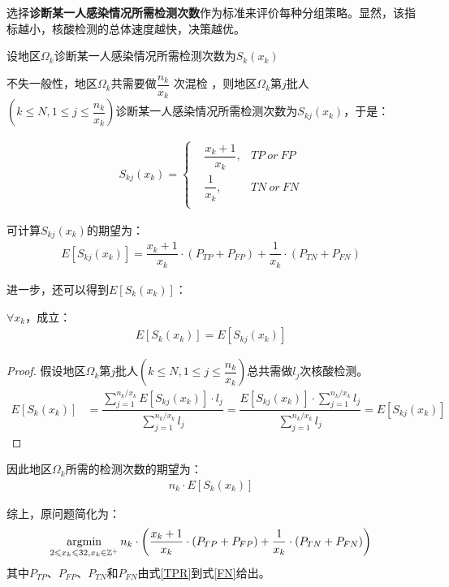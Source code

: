 \documentclass[withoutpreface,bwprint]{cumcmthesis} %
\begin{document}
选择\textbf{诊断某一人感染情况所需检测次数}作为标准来评价每种分组策略。显然，该指标越小，核酸检测的总体速度越快，决策越优。

设地区$\Omega_k$诊断某一人感染情况所需检测次数为$S_{k}(x_k)$

不失一般性，地区$\Omega_k$共需要做$ \dfrac{n_k}{x_k}$ 次混检 ，则地区$\Omega_k$第$j$批人$(k\leqslant N,1 \leqslant j \leqslant \dfrac{n_k}{x_k})$诊断某一人感染情况所需检测次数为$S_{kj}(x_k)$，于是：

\begin{align}
\label{skj}
    S_{kj}(x_k)=\left\{
    \begin{aligned}
        &\dfrac{x_k+1}{x_k},&TP\: or\: FP\\
        &\dfrac{1}{x_k},&TN\: or\: FN\\
    \end{aligned}
    \right.
\end{align}

可计算$ S_{kj}(x_k)$的期望为：
\begin{align*}
    E[S_{kj}(x_k)]=\dfrac{x_k+1}{x_k}\cdot (P_{TP}+P_{FP})+\dfrac{1}{x_k}\cdot (P_{TN}+P_{FN})
\end{align*}

进一步，还可以得到$E[S_k(x_k)]$：
\begin{theorem}
\label{thm-1}
$\forall x_k$，成立：
\begin{align}
    E[S_k(x_k)]=E[S_{kj}(x_k)]
\end{align}
\end{theorem}

\begin{proof}
    假设地区$\Omega_k$第$j$批人$(k\leqslant N,1 \leqslant j \leqslant \dfrac{n_k}{x_k})$总共需做$l_j$次核酸检测。
    \begin{align*}
        E[S_k(x_k)]&=\dfrac{\sum\limits^{n_k/x_k}_{j=1} E[S_{kj}(x_k)]\cdot l_j }{\sum\limits^{n_k/x_k}_{j=1} l_j}  
        =\dfrac{E[S_{kj}(x_k)]\cdot \sum\limits^{n_k/x_k}_{j=1} l_j }{\sum\limits^{n_k/x_k}_{j=1} l_j}
        =E[S_{kj}(x_k)]
    \end{align*}
\end{proof}

因此地区$\Omega_k$所需的检测次数的期望为：
\begin{align}
    {n_k}\cdot{E[S_k(x_k)]}
\end{align}

综上，原问题简化为：
\begin{align}
\label{OMG}
    \operatorname*{\rm argmin}_{2\leqslant x_k \leqslant 32,x_k\in\mathbb{Z}^+}n_k\cdot\left(\dfrac{x_k+1}{x_k}\cdot (P_{TP}+P_{FP})+\dfrac{1}{x_k}\cdot (P_{TN}+P_{FN})\right)
\end{align}
其中$P_{TP}$、$P_{FP}$、$P_{TN}$和$P_{FN}$由式\ref{TPR}到式\ref{FN}给出。%
\end{document}
